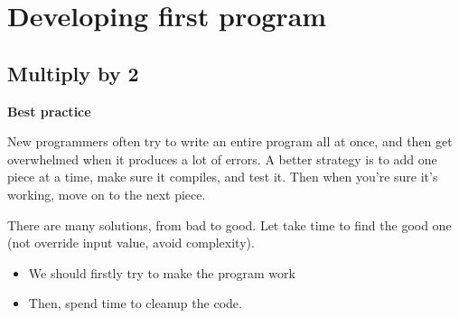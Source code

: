 \documentclass[
  letterpaper,
  DIV=11,
  numbers=noendperiod]{scrreprt}
\providecommand{\tightlist}{%
  \setlength{\itemsep}{0pt}\setlength{\parskip}{0pt}}\usepackage{longtable,booktabs,array}
\begin{document}
\hypertarget{developing-first-program}{%
\section{Developing first program}\label{developing-first-program}}

\hypertarget{multiply-by-2}{%
\subsection{Multiply by 2}\label{multiply-by-2}}

\begin{tcolorbox}[enhanced jigsaw, toprule=.15mm, rightrule=.15mm, opacityback=0, breakable, leftrule=.75mm, colback=white, colframe=quarto-callout-tip-color-frame, arc=.35mm, left=2mm, bottomrule=.15mm]
\begin{minipage}[t]{5.5mm}
\textcolor{quarto-callout-tip-color}{\faLightbulb}
\end{minipage}%
\begin{minipage}[t]{\textwidth - 5.5mm}

\textbf{Best practice}\vspace{2mm}

New programmers often try to write an entire program all at once, and
then get overwhelmed when it produces a lot of errors. A better strategy
is to add one piece at a time, make sure it compiles, and test it. Then
when you're sure it's working, move on to the next piece.

\end{minipage}%
\end{tcolorbox}

There are many solutions, from bad to good. Let take time to find the
good one (not override input value, avoid complexity).

\begin{itemize}
\tightlist
\item
  We should firstly try to make the program work
\item
  Then, spend time to cleanup the code.
\end{itemize}
\end{document}
